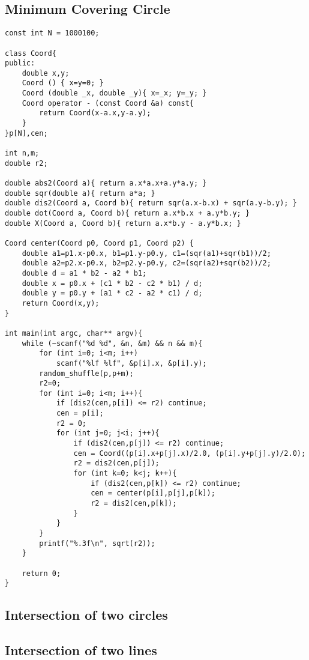 \documentclass[10pt,twocolumn,oneside]{article}
\begin{document}
\subsection{Minimum Covering Circle}
\begin{lstlisting}
const int N = 1000100;

class Coord{
public:
	double x,y;
	Coord () { x=y=0; }
	Coord (double _x, double _y){ x=_x; y=_y; }
	Coord operator - (const Coord &a) const{
		return Coord(x-a.x,y-a.y);
	}
}p[N],cen;

int n,m;
double r2;

double abs2(Coord a){ return a.x*a.x+a.y*a.y; }
double sqr(double a){ return a*a; }
double dis2(Coord a, Coord b){ return sqr(a.x-b.x) + sqr(a.y-b.y); }
double dot(Coord a, Coord b){ return a.x*b.x + a.y*b.y; }
double X(Coord a, Coord b){ return a.x*b.y - a.y*b.x; }

Coord center(Coord p0, Coord p1, Coord p2) {
    double a1=p1.x-p0.x, b1=p1.y-p0.y, c1=(sqr(a1)+sqr(b1))/2;
    double a2=p2.x-p0.x, b2=p2.y-p0.y, c2=(sqr(a2)+sqr(b2))/2;
    double d = a1 * b2 - a2 * b1;
    double x = p0.x + (c1 * b2 - c2 * b1) / d;
    double y = p0.y + (a1 * c2 - a2 * c1) / d;
	return Coord(x,y);
}

int main(int argc, char** argv){
	while (~scanf("%d %d", &n, &m) && n && m){
		for (int i=0; i<m; i++)
			scanf("%lf %lf", &p[i].x, &p[i].y);
		random_shuffle(p,p+m);
		r2=0;
		for (int i=0; i<m; i++){
			if (dis2(cen,p[i]) <= r2) continue;
			cen = p[i];
			r2 = 0;
			for (int j=0; j<i; j++){
				if (dis2(cen,p[j]) <= r2) continue;
				cen = Coord((p[i].x+p[j].x)/2.0, (p[i].y+p[j].y)/2.0);
				r2 = dis2(cen,p[j]);
				for (int k=0; k<j; k++){
					if (dis2(cen,p[k]) <= r2) continue;
					cen = center(p[i],p[j],p[k]);
					r2 = dis2(cen,p[k]);
				}
			}
		}
		printf("%.3f\n", sqrt(r2));
	}
	
	return 0;
}
\end{lstlisting}

\subsection{Intersection of two circles}


\subsection{Intersection of two lines}

\end{document}
